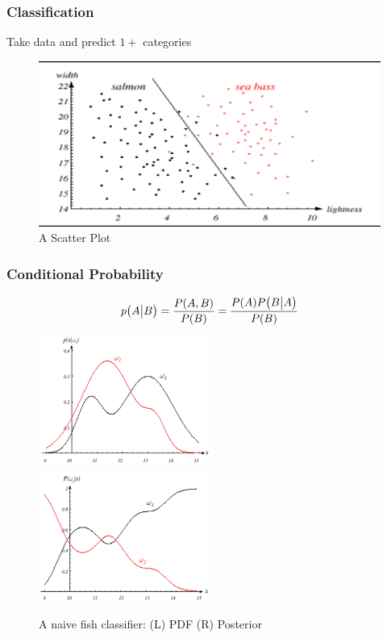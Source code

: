 \documentclass[10pt]{beamer}
\begin{document}
\begin{frame}
	\frametitle{Classification}
	Take data and predict $1+$ categories
	\begin{figure}
		\includegraphics[width=\textwidth,height=0.6\textheight,keepaspectratio=true]{fish_scatter.png}
		\caption{A Scatter Plot}
		\label{fig:fish-scatter}
	\end{figure}
\end{frame}

\begin{frame}
	\frametitle{Conditional Probability}
	\begin{equation}
		p \qty(A \big| B) = \frac{P \qty(A, B)}{P(B)} =\frac{P \qty(A) P \qty(B \big| A)}{P(B)}
	\end{equation}
	\begin{figure}
		\includegraphics[width=0.5\textwidth,height=0.6\textheight,keepaspectratio=true]{pdf_fish.png}~
		\includegraphics[width=0.5\textwidth,height=0.6\textheight,keepaspectratio=true]{posterior_fish.png}
		\caption{A naive fish classifier: (L) PDF (R) Posterior}
		\label{fig:pdf-fish}
	\end{figure}
\end{frame}
\end{document}
